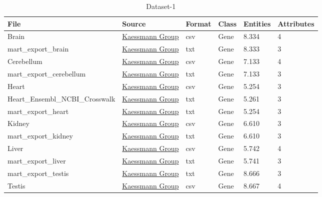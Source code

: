 \documentclass[11pt,titlepage,oneside,openany]{book}
\begin{document}
\begin{table}[!ht]
\centering
\setlength\extrarowheight{2pt} %
\begin{footnotesize}
\begin{tabularx}{\textwidth}{|l|l|l|l|l|l|}
\hline
\textbf{File} & \textbf{Source} & \textbf{Format} & \textbf{Class} & \textbf{Entities} & \textbf{Attributes} & \\ \hline

	Brain & \href{https://www.zmbh.uni-heidelberg.de/kaessmann/}{Kaessmann Group}  & csv & Gene & 8.334 & 4 \\
	
	mart\_export\_brain & \href{https://www.zmbh.uni-heidelberg.de/kaessmann/}{Kaessmann Group} & txt & Gene & 8.333 & 3 \\
	
	Cerebellum & \href{https://www.zmbh.uni-heidelberg.de/kaessmann/}{Kaessmann Group}  & csv & Gene & 7.133 & 4 \\
	
	mart\_export\_cerebellum & \href{https://www.zmbh.uni-heidelberg.de/kaessmann/}{Kaessmann Group} & txt & Gene & 7.133 & 3 \\
	
	Heart & \href{https://www.zmbh.uni-heidelberg.de/kaessmann/}{Kaessmann Group}  & csv & Gene & 5.254 & 3 \\
	
	Heart\_Ensembl\_NCBI\_Crosswalk & \href{https://www.zmbh.uni-heidelberg.de/kaessmann/}{Kaessmann Group} & txt & Gene & 5.261 & 3 \\
	
	mart\_export\_heart & \href{https://www.zmbh.uni-heidelberg.de/kaessmann/}{Kaessmann Group} & txt & Gene & 5.254 & 3 \\
	
	Kidney & \href{https://www.zmbh.uni-heidelberg.de/kaessmann/}{Kaessmann Group}  & csv & Gene & 6.610 & 3 \\
	
	mart\_export\_kidney & \href{https://www.zmbh.uni-heidelberg.de/kaessmann/}{Kaessmann Group} & txt & Gene & 6.610 & 3 \\
	
	Liver & \href{https://www.zmbh.uni-heidelberg.de/kaessmann/}{Kaessmann Group}  & csv & Gene & 5.742 & 4 \\
	
	mart\_export\_liver & \href{https://www.zmbh.uni-heidelberg.de/kaessmann/}{Kaessmann Group} & txt & Gene & 5.741 & 3 \\
	
	mart\_export\_testis & \href{https://www.zmbh.uni-heidelberg.de/kaessmann/}{Kaessmann Group} & txt & Gene & 8.666 & 3 \\
	
	Testis & \href{https://www.zmbh.uni-heidelberg.de/kaessmann/}{Kaessmann Group}  & csv & Gene & 8.667 & 4 \\
  \hline
\end{tabularx}
\end{footnotesize}
\caption{Dataset-1}
\end{table}
\end{document}
